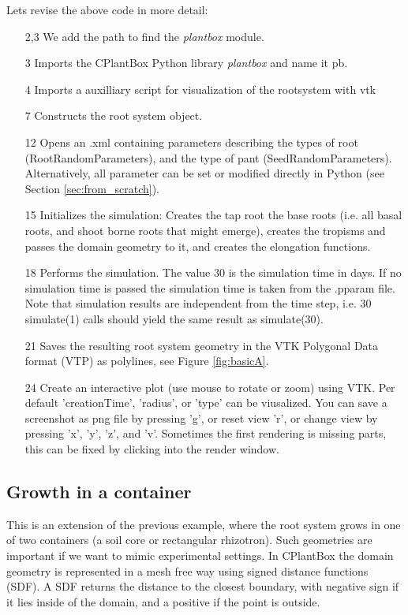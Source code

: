 \noindent 
Lets revise the above code in more detail: 
\begin{itemize}
 \item[2,3] We add the path to find the \emph{plantbox} module.
 \item[3] Imports the CPlantBox Python library \emph{plantbox} and name it pb.
 \item[4] Imports a auxilliary script for visualization of the rootsystem with vtk
 \item[7] Constructs the root system object.
 \item[12] Opens an .xml containing parameters describing the types of root (RootRandomParameters), 
 and the type of pant (SeedRandomParameters). Alternatively, all parameter can be set or modified directly in Python 
 (see Section \ref{sec:from_scratch}).
 \item[15] Initializes the simulation: Creates the tap root the base roots 
 (i.e. all basal roots, and shoot borne roots that might emerge), creates the tropisms and passes the domain geometry to it, 
 and creates the elongation functions. 
 \item[18] Performs the simulation. The value 30 is the simulation time in days. 
 If no simulation time is passed the simulation time is taken from the .pparam file. 
 Note that simulation results are independent from the time step, i.e. 30 simulate(1) calls should yield the same result 
 as simulate(30). 
 \item[21] Saves the resulting root system geometry in the VTK Polygonal Data format (VTP) as polylines, 
 see Figure \ref{fig:basicA}. 
 \item[24] Create an interactive plot (use mouse to rotate or zoom) using VTK. 
 Per default 'creationTime', 'radius', or 'type' can be viusalized.
 You can save a screenshot as png file by pressing 'g', or reset view 'r', or change view by pressing 'x', 'y', 'z', and 'v'.
 Sometimes the first rendering is missing parts, this can be fixed by clicking into the render window. 
 \end{itemize}
  
\subsection{Growth in a container}

This is an extension of the previous example, where the root system grows in one of two containers 
(a soil core or rectangular rhizotron). Such geometries are important if we want to mimic experimental settings. 
In CPlantBox the domain geometry is represented in a mesh free way using signed distance functions (SDF). 
A SDF returns the distance to the closest boundary, with negative sign if it lies inside of the domain, 
and a positive if the point is outside.

